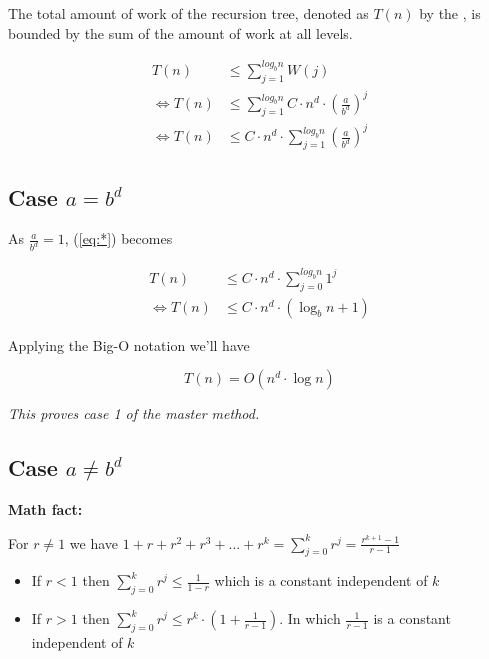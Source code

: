\documentclass{article}
\begin{document}
\noindent The total amount of work of the recursion tree, denoted as $T(n)$ by the , is bounded by the sum of the amount of work at all levels.

\begin{equation}\label{eq:*}\tag{*}
\begin{split}
T(n) & \leq \sum_{j=1}^{log_{b} n} W(j) \\
\iff T(n) & \leq \sum_{j=1}^{log_{b} n} C \cdot n^d \cdot (\frac{a}{b^d})^j \\
\iff T(n) & \leq C \cdot n^d \cdot \sum_{j=1}^{log_{b} n} (\frac{a}{b^d})^j
\end{split}
\end{equation}

\subsection*{Case $a = b^d$}

\noindent As $\frac{a}{b^d} = 1$, (\ref{eq:*}) becomes

\begin{equation*}
\begin{split}
T(n) & \leq C \cdot n^d \cdot \sum_{j=0}^{log_{b} n} 1^j \\
\iff T(n) & \leq C \cdot n^d \cdot (\log_{b} n + 1)   
\end{split}
\end{equation*}


\noindent Applying the Big-O notation we'll have

\begin{equation*}
T(n) = O(n^d \cdot \log n)
\end{equation*}

\noindent \textit{This proves case 1 of the master method.}

\subsection*{Case $a \neq b^d$}

\textbf{Math fact:}

\bigskip

\noindent For $r \neq 1$ we have $1 + r + r^2 + r^3 + ... + r^k = \sum_{j=0}^{k} r^j = \frac{r^{k + 1} - 1}{r - 1}$

\begin{itemize}[label={}]
    \item If $r < 1$ then $\sum_{j=0}^{k} r^j \leq \frac{1}{1 - r}$ which is a constant independent of $k$
    \item If $r > 1$ then $\sum_{j=0}^{k} r^j \leq r^k \cdot (1 + \frac{1}{r - 1})$. In which $\frac{1}{r - 1}$ is a constant independent of $k$
\end{itemize}
\end{document}
